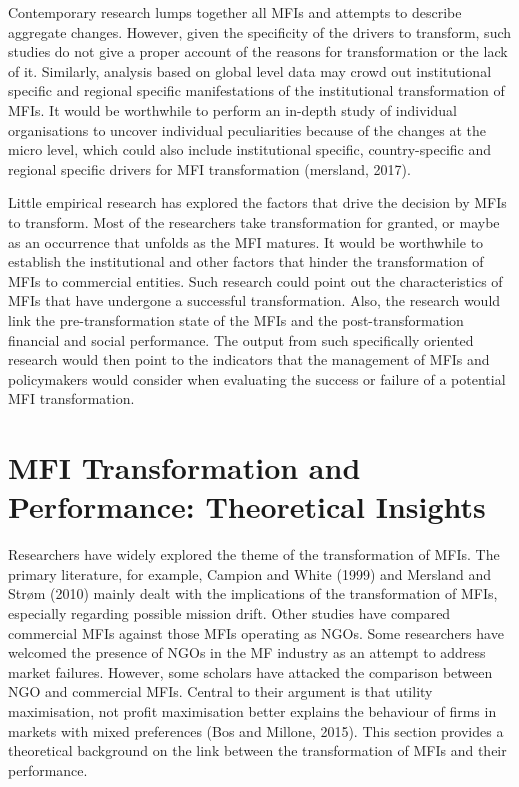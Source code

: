 \documentclass[a4paper, nobind]{templates/ociamthesis}
\begin{document}
Contemporary research lumps together all MFIs and attempts to describe aggregate changes. However, given the specificity of the drivers to transform, such studies do not give a proper account of the reasons for transformation or the lack of it. Similarly, analysis based on global level data may crowd out institutional specific and regional specific manifestations of the institutional transformation of MFIs. It would be worthwhile to perform an in-depth study of individual organisations to uncover individual peculiarities because of the changes at the micro level, which could also include institutional specific, country-specific and regional specific drivers for MFI transformation (mersland, 2017).

Little empirical research has explored the factors that drive the decision by MFIs to transform. Most of the researchers take transformation for granted, or maybe as an occurrence that unfolds as the MFI matures. It would be worthwhile to establish the institutional and other factors that hinder the transformation of MFIs to commercial entities. Such research could point out the characteristics of MFIs that have undergone a successful transformation. Also, the research would link the pre-transformation state of the MFIs and the post-transformation financial and social performance. The output from such specifically oriented research would then point to the indicators that the management of MFIs and policymakers would consider when evaluating the success or failure of a potential MFI transformation.

\hypertarget{mfi-transformation-and-performance-theoretical-insights}{%
\section{MFI Transformation and Performance: Theoretical Insights}\label{mfi-transformation-and-performance-theoretical-insights}}

\noindent Researchers have widely explored the theme of the transformation of MFIs. The primary literature, for example, Campion and White (1999) and Mersland and Strøm (2010) mainly dealt with the implications of the transformation of MFIs, especially regarding possible mission drift. Other studies have compared commercial MFIs against those MFIs operating as NGOs. Some researchers have welcomed the presence of NGOs in the MF industry as an attempt to address market failures. However, some scholars have attacked the comparison between NGO and commercial MFIs. Central to their argument is that utility maximisation, not profit maximisation better explains the behaviour of firms in markets with mixed preferences (Bos and Millone, 2015). This section provides a theoretical background on the link between the transformation of MFIs and their performance.
\end{document}
